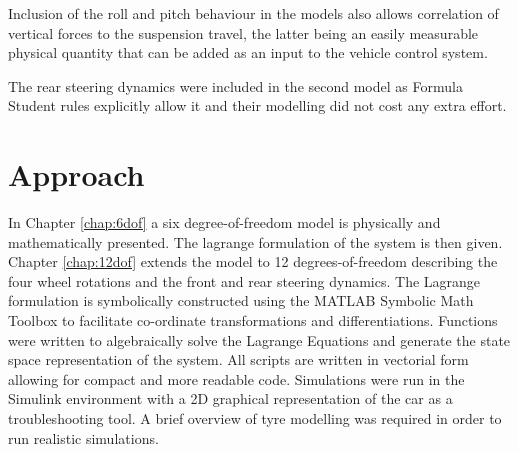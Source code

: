 Inclusion of the roll and pitch behaviour in the models also allows correlation of vertical forces to the suspension travel, the latter being an easily measurable physical quantity that can be added as an input to the vehicle control system.

The rear steering dynamics were included in the second model as Formula Student rules explicitly allow it and their modelling did not cost any extra effort.

\section{Approach}
\label{sec:approach}
In Chapter \ref{chap:6dof} a six degree-of-freedom model is physically and mathematically presented. The lagrange formulation of the system is then given. Chapter \ref{chap:12dof} extends the model to 12 degrees-of-freedom describing the four wheel rotations and the front and rear steering dynamics.
The Lagrange formulation is symbolically constructed using the MATLAB Symbolic Math Toolbox to facilitate co-ordinate transformations and differentiations.
Functions were written to algebraically solve the Lagrange Equations and generate the state space representation of the system.
All scripts are written in vectorial form allowing for compact and more readable code.
Simulations were run in the Simulink environment with a 2D graphical representation of the car as a troubleshooting tool.
A brief overview of tyre modelling was required in order to run realistic simulations.
